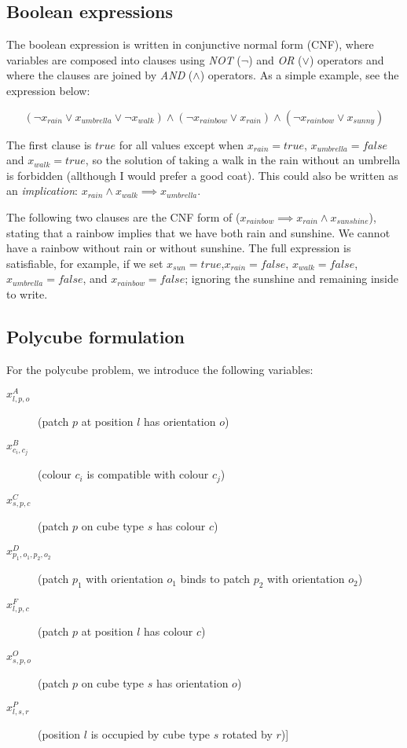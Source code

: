 \subsection{Boolean expressions}

The boolean expression is written in conjunctive normal form (CNF), where variables are composed into clauses using \emph{NOT} (\(\lnot\)) and \emph{OR} (\(\lor\)) operators and where the clauses are joined by \emph{AND} (\(\land\)) operators. As a simple example, see the expression below:

\[
    (\lnot x_{rain} \lor x_{umbrella} \lor  \lnot x_{walk}) \land
    (\lnot x_{rainbow} \lor x_{rain}) \land
    (\lnot x_{rainbow} \lor x_{sunny})
\]

The first clause is \(true\) for all values except when \(x_{rain}=true\), \(x_{umbrella}=false\) and \(x_{walk}=true\), so the solution of taking a walk in the rain without an umbrella is forbidden (allthough I would prefer a good coat). This could also be written as an \emph{implication}: \(x_{rain} \land x_{walk} \implies x_{umbrella}\).

The following two clauses are the CNF form of (\(x_{rainbow} \implies  x_{rain} \land x_{sunshine}\)), stating that a rainbow implies that we have both rain and sunshine. We cannot have a rainbow without rain or without sunshine. The full expression is satisfiable, for example, if we set \(x_{sun}=true\),\(x_{rain}=false\), \(x_{walk}=false\), \(x_{umbrella}=false\), and \(x_{rainbow}=false\); ignoring the sunshine and remaining inside to write.

\subsection{Polycube formulation}

For the polycube problem, we introduce the following variables:
\begin{description}
    \item[\(x_{l,p,o}^{A}\)] (patch \(p\) at position \(l\) has orientation \(o\))
    \item[\(x_{c_i,c_j}^{B}\)] (colour \(c_i\) is compatible with colour \(c_j\))
    \item[\(x_{s,p,c}^{C}\)] (patch \(p\) on cube type \(s\) has colour \(c\))
    \item[\(x_{p_1,o_1,p_2,o_2}^{D}\)] (patch \(p_1\) with orientation \(o_1\) binds to patch \(p_2\) with orientation \(o_2\))
    \item[\(x_{l,p,c}^{F}\)] (patch \(p\) at position \(l\) has colour \(c\))
    \item[\(x_{s,p,o}^{O}\)] (patch \(p\) on cube type \(s\) has orientation \(o\))
    \item[\(x_{l,s,r}^{P}\)] (position \(l\) is occupied by cube type \(s\) rotated by \(r\))] 
\end{description}

